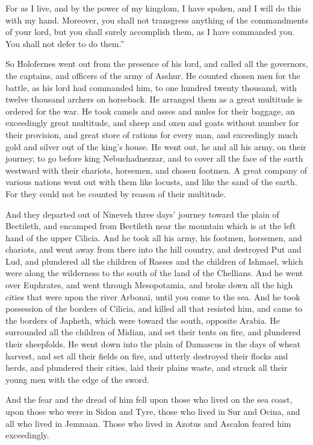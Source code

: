 {For as I live, and by the power of my kingdom, I have spoken, and I will do this with my hand.
Moreover, you shall not transgress anything of the commandments of your lord, but you shall surely accomplish them, as I have commanded you. You shall not defer to do them.”
\par }{\PP {}So Holofernes went out from the presence of his lord, and called all the governors, the captains, and officers of the army of Asshur.
He counted chosen men for the battle, as his lord had commanded him, to one hundred twenty thousand, with twelve thousand archers on horseback.
He arranged them as a great multitude is ordered for the war.
He took camels and asses and mules for their baggage, an exceedingly great multitude, and sheep and oxen and goats without number for their provision,
and great store of rations for every man, and exceedingly much gold and silver out of the king’s house.
He went out, he and all his army, on their journey, to go before king Nebuchadnezzar, and to cover all the face of the earth westward with their chariots, horsemen, and chosen footmen.
A great company of various nations went out with them like locusts, and like the sand of the earth. For they could not be counted by reason of their multitude.
\par }{\PP {}And they departed out of Nineveh three days’ journey toward the plain of Bectileth, and encamped from Bectileth near the mountain which is at the left hand of the upper Cilicia.
And he took all his army, his footmen, horsemen, and chariots, and went away from there into the hill country,
and destroyed Put and Lud, and plundered all the children of Rasses and the children of Ishmael, which were along the wilderness to the south of the land of the Chellians.
And he went over Euphrates, and went through Mesopotamia, and broke down all the high cities that were upon the river Arbonai, until you come to the sea.
And he took possession of the borders of Cilicia, and killed all that resisted him, and came to the borders of Japheth, which were toward the south, opposite Arabia.
He surrounded all the children of Midian, and set their tents on fire, and plundered their sheepfolds.
He went down into the plain of Damascus in the days of wheat harvest, and set all their fields on fire, and utterly destroyed their flocks and herds, and plundered their cities, laid their plains waste, and struck all their young men with the edge of the sword.
\par }{\PP {}And the fear and the dread of him fell upon those who lived on the sea coast, upon those who were in Sidon and Tyre, those who lived in Sur and Ocina, and all who lived in Jemnaan. Those who lived in Azotus and Ascalon feared him exceedingly.

}
